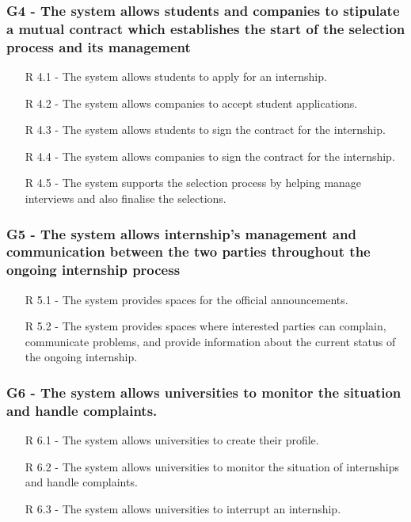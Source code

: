 \subsubsection{G4 - The system allows students and companies to stipulate a mutual contract
which establishes the start of the selection process and its management}
\hspace*{15mm}
\begin{itemize}
    \item [R 4.1] - The system allows students to apply for an internship.
    \item [R 4.2] - The system allows companies to accept student applications.
    \item [R 4.3] - The system allows students to sign the contract for the internship.
    \item [R 4.4] - The system allows companies to sign the contract for the internship.
    \item [R 4.5] - The system supports the selection process by helping manage interviews and also finalise the selections.
\end{itemize}
\hspace*{15mm}

\subsubsection{G5 - The system allows internship's management and communication between the two parties
throughout the ongoing internship process}
\hspace*{15mm}
\begin{itemize}
    \item [R 5.1] - The system provides spaces for the official announcements.
    \item [R 5.2] - The system provides spaces where interested parties can complain,
    communicate problems, and provide information about the current status of the ongoing internship.
\end{itemize}
\hspace*{15mm}

\subsubsection{G6 - The system allows universities to monitor the situation and handle complaints.}
\hspace*{15mm}
\begin{itemize}
    \item [R 6.1] - The system allows universities to create their profile.
    \item [R 6.2] - The system allows universities to monitor the situation of internships and handle complaints.
    \item [R 6.3] - The system allows universities to interrupt an internship.
\end{itemize}
\hspace*{15mm}

